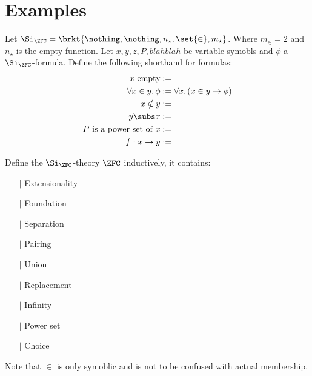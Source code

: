 \section{Examples}







\begin{dfn}
    Let $\Si_{\ZFC} = \brkt{\nothing, \nothing, n_\star, \set{\in}, m_\star}$.
    Where $m_\in = 2$ and $n_\star$ is the empty function.
    Let $x,y,z, P, blahblah$ be variable symobls and %
    $\phi$ a $\Si_\ZFC$-formula.%
    Define the following shorthand for formulas:
    \begin{align*}%
        x \text{ empty} &:= \\
        \forall x \in y, \phi &:= \forall x, (x \in y \to \phi)\\
        x \notin y &:=\\
        y \subs x &:= \\
        P \text{ is a power set of } x &:= \\
        f : x \to y &:= 
    \end{align*}
\end{dfn}

\begin{eg}[$\ZFC$]
    Define the $\Si_{\ZFC}$-theory $\ZFC$ inductively,
    it contains:
    \begin{itemize}
        \item[$\vert$] Extensionality
        \item[$\vert$] Foundation
        \item[$\vert$] Separation
        \item[$\vert$] Pairing
        \item[$\vert$] Union
        \item[$\vert$] Replacement
        \item[$\vert$] Infinity
        \item[$\vert$] Power set
        \item[$\vert$] Choice 
    \end{itemize}
    Note that $\in$ is only symoblic and is not to be confused with 
    actual membership.
\end{eg}

